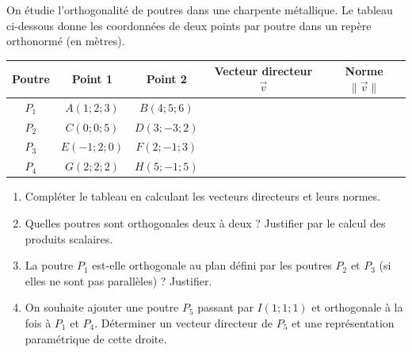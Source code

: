 \documentclass[11pt]{article}
\begin{document}
\begin{exercice}
On étudie l'orthogonalité de poutres dans une charpente métallique. 
Le tableau ci-dessous donne les coordonnées de deux points par poutre dans un repère orthonormé (en mètres).

\begin{center}
\begin{tabular}{|c|c|c|c|c|}
\hline
Poutre & Point 1 & Point 2 & Vecteur directeur $\vec v$ & Norme $\|\vec v\|$ \\ \hline
$P_1$ & $A(1;2;3)$ & $B(4;5;6)$ &  &  \\ \hline
$P_2$ & $C(0;0;5)$ & $D(3;-3;2)$ &  &  \\ \hline
$P_3$ & $E(-1;2;0)$ & $F(2;-1;3)$ &  &  \\ \hline
$P_4$ & $G(2;2;2)$ & $H(5;-1;5)$ &  &  \\ \hline
\end{tabular}
\end{center}

\begin{enumerate}
    \item Compléter le tableau en calculant les vecteurs directeurs et leurs normes.
    \item Quelles poutres sont orthogonales deux à deux ? Justifier par le calcul des produits scalaires.
    \item La poutre $P_1$ est-elle orthogonale au plan défini par les poutres $P_2$ et $P_3$ (si elles ne sont pas parallèles) ? Justifier.
    \item On souhaite ajouter une poutre $P_5$ passant par $I(1;1;1)$ et orthogonale à la fois à $P_1$ et $P_4$. 
    Déterminer un vecteur directeur de $P_5$ et une représentation paramétrique de cette droite.
\end{enumerate}
\end{exercice}
\end{document}
